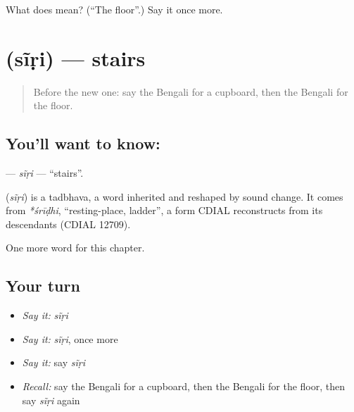 \begin{tcolorbox}[breakable,colback=teal!4,colframe=teal!35!black,title={Before you move on}]
What does  mean? (\textquotedblleft{}The floor\textquotedblright{}.) Say it once more.
\end{tcolorbox}
\section[\texorpdfstring{\bn{সিঁড়ি} (sĩṛi)}{সিঁড়ি (sĩṛi)}]{ (sĩṛi) — stairs}

\label{lesson:BN-C61-siri}



\begin{quote}
Before the new one: say the Bengali for a cupboard, then the Bengali for the floor.
\end{quote}

\subsection*{You'll want to know: }
\textbf{} — \emph{sĩṛi} — \textquotedblleft{}stairs\textquotedblright{}.

\begin{cousinweb}
\textbf{} (\emph{sĩṛi}) is a tadbhava, a word inherited and reshaped by sound change. It comes from \emph{*śrīḍhi}, \textquotedblleft{}resting-place, ladder\textquotedblright{}, a form CDIAL reconstructs from its descendants (CDIAL 12709).
\end{cousinweb}

\begin{grammarlens}[title={What you've built}]
One more word for this chapter.
\end{grammarlens}

\subsection*{Your turn}
\begin{itemize}
\raggedright
  \item \emph{Say it:} \emph{sĩṛi}
  \item \emph{Say it:} \emph{sĩṛi}, once more
  \item \emph{Say it:} say \emph{sĩṛi}
  \item \emph{Recall:} say the Bengali for a cupboard, then the Bengali for the floor, then say \emph{sĩṛi} again
\end{itemize}

